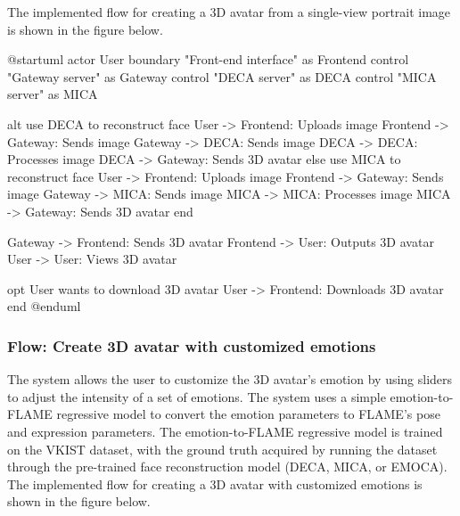 The implemented flow for creating a 3D avatar from a single-view portrait image is shown in the figure below.

\begin{umlfigure}
    @startuml
    actor User
    boundary "Front-end interface" as Frontend
    control "Gateway server" as Gateway
    control "DECA server" as DECA
    control "MICA server" as MICA


    alt use DECA to reconstruct face
    User -> Frontend: Uploads image
    Frontend -> Gateway: Sends image
    Gateway -> DECA: Sends image
    DECA -> DECA: Processes image
    DECA -> Gateway: Sends 3D avatar
    else use MICA to reconstruct face
    User -> Frontend: Uploads image
    Frontend -> Gateway: Sends image
    Gateway -> MICA: Sends image
    MICA -> MICA: Processes image
    MICA -> Gateway: Sends 3D avatar
    end

    Gateway -> Frontend: Sends 3D avatar
    Frontend -> User: Outputs 3D avatar
    User -> User: Views 3D avatar

    opt User wants to download 3D avatar
    User -> Frontend: Downloads 3D avatar
    end
    @enduml
\end{umlfigure}


\subsubsection{Flow: Create 3D avatar with customized emotions}
The system allows the user to customize the 3D avatar's emotion by using sliders to adjust the intensity of a set of emotions. The system uses a simple emotion-to-FLAME regressive model to convert the emotion parameters to FLAME's pose and expression parameters. The emotion-to-FLAME regressive model is trained on the VKIST dataset, with the ground truth acquired by running the dataset through the pre-trained face reconstruction model (DECA, MICA, or EMOCA). The implemented flow for creating a 3D avatar with customized emotions is shown in the figure below.

